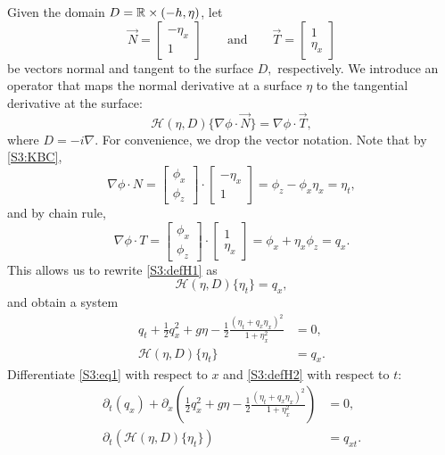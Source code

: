 \documentclass[11pt,reqno,oneside,a4paper]{article}
\begin{document}
Given the domain $D = \mathbb R \times (-h, \eta)$, let 
\[  
\vec{N} = \begin{bmatrix} -\eta_x \\ 1 \end{bmatrix} \qquad
\mbox{and} \qquad
\vec{T} =\begin{bmatrix} 1 \\ \eta_x \end{bmatrix} \]
be vectors normal and tangent to the surface $D,$ respectively. We introduce an operator that maps the normal derivative at a surface $\eta$ to the tangential derivative at the surface:
\begin{equation}\label{S3:defH1}
\mathcal{H}(\eta, D) \{ \nabla \phi \cdot \vec{N} \} = \nabla \phi \cdot \vec{T},
\end{equation}
where $D = - i \nabla.$ For convenience, we drop the vector notation. Note that by \eqref{S3:KBC}, 
\[ 
\nabla \phi \cdot N = \begin{bmatrix} \phi_x \\ \phi_z \end{bmatrix} \cdot \begin{bmatrix} -\eta_x \\ 1 \end{bmatrix} = \phi_z - \phi_x \eta_x = \eta_t,
\] 
and by chain rule,
\[ 
\nabla \phi \cdot T = \begin{bmatrix} \phi_x \\ \phi_z \end{bmatrix} \cdot \begin{bmatrix} 1 \\ \eta_x \end{bmatrix} = \phi_x + \eta_x \phi_z = q_x.
\]
This allows us to rewrite \eqref{S3:defH1} as 
\begin{equation}\label{S3:defH2}
\mathcal{H}(\eta, D) \{ \eta_t \} = q_x,
\end{equation}
and obtain a system
\begin{align*}
q_t + \frac{1}{2}q_x^2 + g \eta - \frac{1}{2} \frac{(\eta_t + q_x \eta_x)^2}{1 + \eta_x^2} &= 0, \\
\mathcal{H}(\eta, D) \{ \eta_t \} &= q_x.
\end{align*}
Differentiate \eqref{S3:eq1} with respect to $x$ and \eqref{S3:defH2} with respect to $t:$
\begin{align}
\partial_t(q_x) + \partial_x\left(\frac{1}{2}q_x^2 + g \eta - \frac{1}{2} \frac{(\eta_t + q_x \eta_x)^2}{1 + \eta_x^2}\right) &= 0, \label{S3:eq2} \\
\partial_t(\mathcal{H}(\eta, D) \{ \eta_t \}) &= q_{xt}. \label{S3:defH3}
\end{align}
\end{document}
